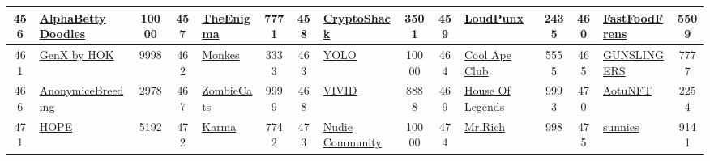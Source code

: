 \begin{table*}[]
{\begin{tabular}{|c|l|c|c|l|c|c|l|c|c|l|c|c|l|c|}
        456   & \href{https://alphabettydoodles.io/}{AlphaBetty Doodles}                           & 10000             & 457   & \href{https://www.enigmaeconomy.com/}{TheEnigma}                                                  & 7771              & 458   & \href{https://cryptoshack.club/\#}{CryptoShack}                                   & 3501              & 459   & \href{https://loudpunx.com}{LoudPunx}                                         & 2435              & 460   & \href{http://fastfoodfren.com}{FastFoodFrens}                                             & 5509                                    \\ \hline
        461   & \href{https://genzeroes.com/}{GenX by HOK}                                         & 9998              & 462   & \href{https://monkeverse.io/}{Monkes}                                                             & 3333              & 463   & \href{https://yolo.holiday/}{YOLO}                                                & 10000             & 464   & \href{https://coolapeclub.xyz}{Cool Ape Club}                                 & 5555              & 465   & \href{http://www.gunslingersnft.com}{GUNSLINGERS}                                         & 7777                                    \\ \hline
        466   & \href{http://anonymice.com}{AnonymiceBreeding}                                     & 2978              & 467   & \href{https://www.zombiecats.io/}{ZombieCats}                                                     & 9999              & 468   & \href{https://www.vivid.limited}{VIVID}                                           & 8888              & 469   & \href{http://houseoflegends.art/}{House Of Legends}                           & 9993              & 470   & \href{https://www.aotu.world}{AotuNFT}                                                    & 2254                                    \\ \hline
        471   & \href{https://azragames.com}{HOPE}                                                 & 5192              & 472   & \href{https://onchainmonkey.com/}{Karma}                                                          & 7742              & 473   & \href{http://nudiecommunity.io}{Nudie Community}                                  & 10000             & 474   & \href{http://drji.club}{Mr.Rich}                                              & 998               & 475   & \href{http://sunniesnft.com}{sunnies}                                                     & 9141                                    \\ \hline

\end{tabular}}
\end{table*}

